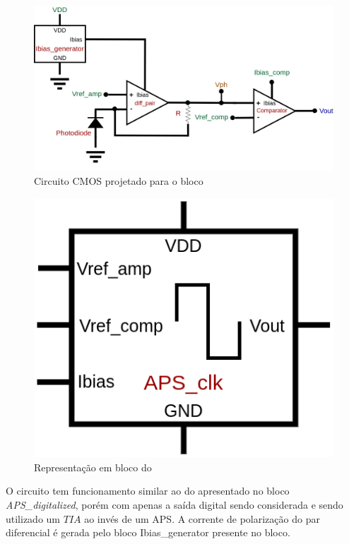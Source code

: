 \begin{figure}[htb]
 \label{\NomePFig}
 \centering
    \centering
    \caption{Circuito CMOS projetado para o bloco \NomeBloco} 
    \includegraphics[scale=0.35]{Circuitos/APS_clk.png}
\end{figure}

\begin{figure}[htb]
 \centering
    \centering
    \caption{Representa{\c c}\~ao em bloco do \NomeBloco} \label{\NomeSFig}
    \includegraphics[scale=0.5]{Circuitos/APS_clk_block.png}
\end{figure}

O circuito tem funcionamento similar ao do apresentado no bloco \emph{APS\_digitalized}, por\'em com apenas a sa\'ida digital sendo considerada e sendo utilizado um $TIA$ ao inv\'es de um APS. A corrente de polariza{\c c}\~ao do par diferencial \'e gerada pelo bloco Ibias\_generator presente no bloco.

